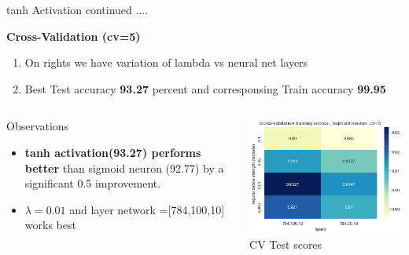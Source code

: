 \documentclass[12pt,t]{beamer}
\begin{document}
\begin{frame}[t]    
    \large tanh Activation continued ....
    
    \scriptsize

    \vspace{10pt}
    \textbf{Cross-Validation (cv=5)}
    \begin{enumerate}
        \item On rights we have variation of lambda vs neural net layers 
        \item Best Test accuracy \textbf{93.27 }  percent and corresponsing Train accuracy \textbf{99.95}
      
    \end{enumerate}
    \begin{columns}
        \begin{column}[T]{0.4\linewidth}
           \begin{block}{Observations}
               \begin{itemize}
                   \item \textbf{tanh activation(93.27) performs better} than sigmoid neuron (92.77) by a 
                    significant 0.5 improvement.
                    \item $\lambda =0.01$ and layer network =[784,100,10] works best  
               \end{itemize}
           \end{block}
        \end{column}
        \begin{column}[T]{0.6\linewidth}
            \includegraphics[width=\linewidth]{tanh/cv_scores.png}
            \centering CV Test scores
        \end{column}
    \end{columns}
\end{frame}
\end{document}
